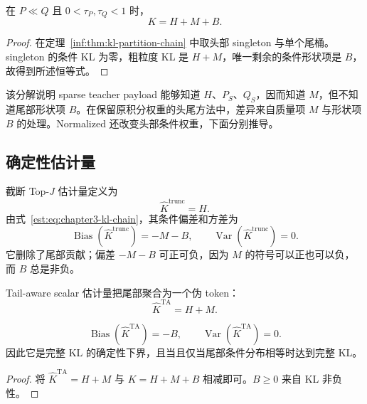 \documentclass[lang=cn,scheme=chinese,openany]{../book/elegantbook}
\newcommand{\Var}{\operatorname{Var}}
\begin{document}
\begin{corollary}
\label{est:thm:chapter3-kl-chain}
在 $P\ll Q$ 且 $0<\tau_P,\tau_Q<1$ 时，
\begin{equation}
 K=H+M+B.
\label{est:eq:chapter3-kl-chain}
\end{equation}
\end{corollary}

\begin{proof}
在定理~\ref{inf:thm:kl-partition-chain} 中取头部 singleton 与单个尾桶。singleton 的条件 KL 为零，粗粒度 KL 是 $H+M$，唯一剩余的条件形状项是 $B$，故得到所述恒等式。
\end{proof}

该分解说明 sparse teacher payload 能够知道 $H$、$P_S$、$Q_S$，因而知道 $M$，但不知道尾部形状项 $B$。在保留原积分权重的头尾方法中，差异来自质量项 $M$ 与形状项 $B$ 的处理。Normalized 还改变头部条件权重，下面分别推导。

\subsection{确定性估计量}

截断 Top-$J$ 估计量定义为
\begin{equation*}
 \widehat K^{\mathrm{trunc}}=H.
\end{equation*}
由式~\eqref{est:eq:chapter3-kl-chain}，其条件偏差和方差为
\begin{equation}
 \operatorname{Bias}(\widehat K^{\mathrm{trunc}})=-M-B,
 \qquad
 \Var(\widehat K^{\mathrm{trunc}})=0.
 \label{est:eq:chapter3-trunc-bias-var}
\end{equation}
它删除了尾部贡献；偏差 $-M-B$ 可正可负，因为 $M$ 的符号可以正也可以负，而 $B$ 总是非负。

Tail-aware scalar 估计量把尾部聚合为一个伪 token：
\begin{equation*}
 \widehat K^{\mathrm{TA}}=H+M.
\end{equation*}

\begin{proposition}
\label{est:prop:chapter3-ta-scalar}
\begin{equation*}
 \operatorname{Bias}(\widehat K^{\mathrm{TA}})=-B,
 \qquad
 \Var(\widehat K^{\mathrm{TA}})=0.
\end{equation*}
因此它是完整 KL 的确定性下界，且当且仅当尾部条件分布相等时达到完整 KL。
\end{proposition}

\begin{proof}
将 $\widehat K^{\mathrm{TA}}=H+M$ 与 $K=H+M+B$ 相减即可。$B\geq0$ 来自 KL 非负性。
\end{proof}
\end{document}
